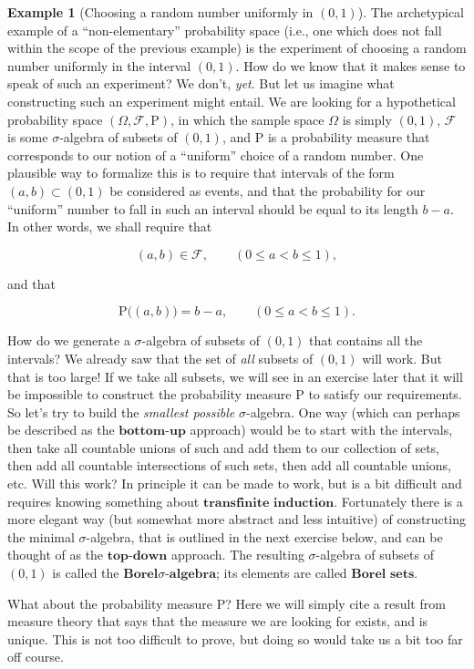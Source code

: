 \documentclass[11pt]{report}
\providecommand{\cal}{\mathcal}
\theoremstyle{plain}
\theoremstyle{definition}
\newtheorem{example}[thm]{Example}
\begin{document}
\begin{example}[Choosing a random number uniformly in $(0,1)$]
The archetypical example of a ``non-elementary''
probability space (i.e., one which does not fall
within the scope of the previous example) is the
experiment of choosing a random number uniformly in
the interval $(0,1)$. How do we know that it makes
sense to speak of such an experiment? We don't, \emph{yet}.
But let us imagine what constructing such an
experiment might entail. We are looking for a
hypothetical probability space
$(\Omega, {\cal F}, \mathrm{P})$, in which the sample
space $\Omega$ is simply $(0,1)$, ${\cal F}$ is some
$\sigma$-algebra of subsets of $(0,1)$, and
$\mathrm{P}$ is a probability measure that
corresponds to our notion of a ``uniform'' choice of a
random number. One plausible way to formalize this is
to require that intervals of the form
$(a,b) \subset (0,1)$ be considered as events, and
that the probability for our ``uniform'' number to
fall in such an interval should be equal to its length
$b-a$. In other words, we shall require that

\[
(a,b) \in {\cal F}, \qquad (0\le a<b\le 1),
\]

and that

\begin{equation*} \tag{11}\label{eq:lebesgue}
\mathrm{P}\big((a,b)\big) = b-a, \qquad (0\le a<b\le 1).
\end{equation*}

How do we generate a $\sigma$-algebra of subsets of
$(0,1)$ that contains all the intervals? We already
saw that the set of \emph{all} subsets of $(0,1)$ will
work. But that is too large! If we take all subsets,
we will see in an exercise later that it will be
impossible to construct the probability measure
$\mathrm{P}$ to satisfy our requirements. So let's
try to build the \emph{smallest possible} $\sigma$-algebra.
One way (which can perhaps be described as the
$\textbf{bottom-up}$ approach) would be to start with
the intervals, then take all countable unions of such
and add them to our collection of sets, then add all
countable intersections of such sets, then add all
countable unions, etc. Will this work? In principle it
can be made to work, but is a bit difficult and
requires knowing something about
$\textbf{transfinite induction}$. Fortunately there
is a more elegant way (but somewhat more abstract and
less intuitive) of constructing the minimal
$\sigma$-algebra, that is outlined in the next
exercise below, and can be thought of as the
$\textbf{top-down}$ approach. The resulting
$\sigma$-algebra of subsets of $(0,1)$ is called the
$\textbf{Borel$\sigma$-algebra}$; its elements are
called $\textbf{Borel sets}$.

What about the probability measure $\mathrm{P}$? Here
we will simply cite a result from measure theory that
says that the measure we are looking for exists, and
is unique. This is not too difficult to prove, but
doing so would take us a bit too far off course.
\end{example}
\end{document}
